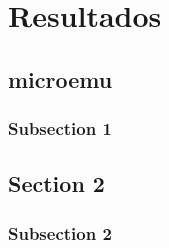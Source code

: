 \chapter{Resultados}
\label{ch3}

\section{microemu}
    \subsection{Subsection 1}


	
\section{Section 2}
    \subsection{Subsection 2}